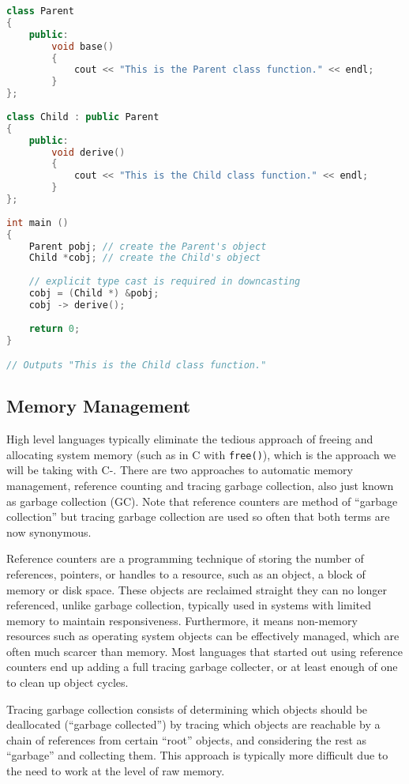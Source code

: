 \begin{lstlisting}[language=C++]
class Parent  
{  
    public:  
        void base()  
        {  
            cout << "This is the Parent class function." << endl;   
        }  
};  
  
class Child : public Parent  
{  
    public:  
        void derive()  
        {  
            cout << "This is the Child class function." << endl;  
        }  
};  
  
int main ()  
{  
    Parent pobj; // create the Parent's object
    Child *cobj; // create the Child's object  
      
    // explicit type cast is required in downcasting  
    cobj = (Child *) &pobj;  
    cobj -> derive();  
      
    return 0;  
}  

// Outputs "This is the Child class function."
\end{lstlisting}

\subsection{Memory Management}

High level languages typically eliminate the tedious approach of freeing and allocating system memory (such as in C with \verb+free()+), which is the approach we will be taking with C-. There are two approaches to automatic memory management, reference counting and tracing garbage collection, also just known as garbage collection (\acs{GC}). Note that reference counters are method of ``garbage collection'' but tracing garbage collection are used so often that both terms are now synonymous.

Reference counters are a programming technique of storing the number of references, pointers, or handles to a resource, such as an object, a block of memory or disk space. These objects are reclaimed straight they can no longer referenced, unlike garbage collection, typically used in systems with limited memory to maintain responsiveness. Furthermore, it means non-memory resources such as operating system objects can be effectively managed, which are often much scarcer than memory. Most languages that started out using reference counters end up adding a full tracing garbage collecter, or at least enough of one to clean up object cycles. 

Tracing garbage collection consists of determining which objects should be deallocated (``garbage collected'') by tracing which objects are reachable by a chain of references from certain ``root'' objects, and considering the rest as ``garbage'' and collecting them. This approach is typically more difficult due to the need to work at the level of raw memory.


